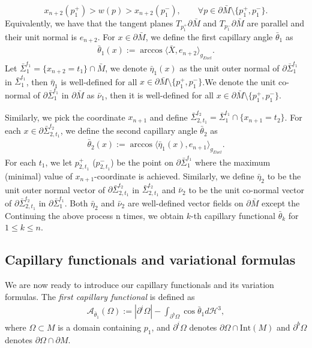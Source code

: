 \documentclass[11pt,letterpaper]{amsart}
\begin{document}
\[
x_{n+2}(p_1^+)>w(p)>x_{n+2}(p_1^-),\qquad \forall p\in \partial \bar{M}\setminus\{{p_1^+,p_1^-}\}.
\]
Equivalently, we have that the tangent planes $T_{p_1^+}\partial \bar{M}$ and $T_{p_1^-}\partial \bar{M}$ are parallel and their unit normal is $e_{n+2}$.
For $x\in\partial \bar{M}$, we define the first capillary angle $\bar{\theta}_1$ as
\begin{align*}
    \bar{\theta}_1(x):=\arccos \langle\bar{X},e_{n+2}\rangle_{g_{Eucl}}.
\end{align*}
Let $\bar{\Sigma}_1^{t_1}=\{x_{n+2}=t_1\}\cap \bar{M}$, we denote $\bar{\eta}_1(x)$ as the unit outer normal of $\partial\bar{\Sigma}_1^{t_1}$ in $\bar{\Sigma}_1^{t_1}$, then $\bar{\eta}_1$ is well-defined for all $x\in \partial \bar{M}\setminus\{p_1^+,p_1^-\}$.We denote the unit co-normal of $\partial\bar{\Sigma}_1^{t_1}$ in $\partial \bar{M} $ as $\bar{\nu}_1$, then it is well-defined for all $x\in \partial \bar{M}\setminus\{p_1^+,p_1^-\}$.

Similarly, we pick the coordinate $x_{n+1}$ and define $\bar{\Sigma}_{2,t_1}^{t_2}=\bar{\Sigma}_1^{t_1}\cap \{x_{n+1}=t_2\}$. For each $x\in\partial\bar{\Sigma}^{t_2}_{2,t_1}$, we define the second capillary angle $\bar{\theta}_2$ as
\begin{align*}
    \bar{\theta}_2(x):=\arccos \langle\bar{\eta}_1(x),e_{n+1}\rangle_{g_{Eucl}}.
\end{align*}
For each $t_1$, we let $p_{2,t_1}^{+}$ ($p_{2,t_1}^-$) be the point on $\partial \bar{\Sigma}_1^{t_1}$ where the maximum (minimal) value of $x_{n+1}$-coordinate is achieved.
Similarly, we define $\bar{\eta}_2$ to be the unit outer normal vector of $\partial\bar{\Sigma}_{2,t_1}^{t_2}$ in $\bar{\Sigma}_{2,t_1}^{t_2}$ and $\bar{\nu}_2$ to be the unit co-normal vector of $\partial\bar{\Sigma}_{2,t_1}^{t_2}$ in $\partial\bar{\Sigma}_1^{t_1}$. Both $\bar{\eta}_2$ and $\bar{\nu}_2$ are well-defined vector fields on $\partial \bar{M}$ except the
Continuing the above process n times, we obtain $k$-th capillary functional $\bar{\theta}_{k}$ for $1\leq k\leq n$.

\subsection{Capillary functionals and variational formulas}
We are now ready to introduce our capillary functionals and its variation formulas. The \textit{first capillary functional} is defined as
\begin{align}
\mathcal A_{\bar{\theta}_1}(\Omega):=|\partial^i\Omega|-\int_{\partial^b \Omega}\cos\bar{\theta}_1 d\mathcal H^3,
\end{align}
where $\Omega\subset M$ is a domain containing $p_1$, and $\partial^i\Omega$ denotes $\partial \Omega\cap \text{Int}(M)$ and $\partial^b\Omega$ denotes $\partial\Omega\cap\partial M$.
\end{document}

